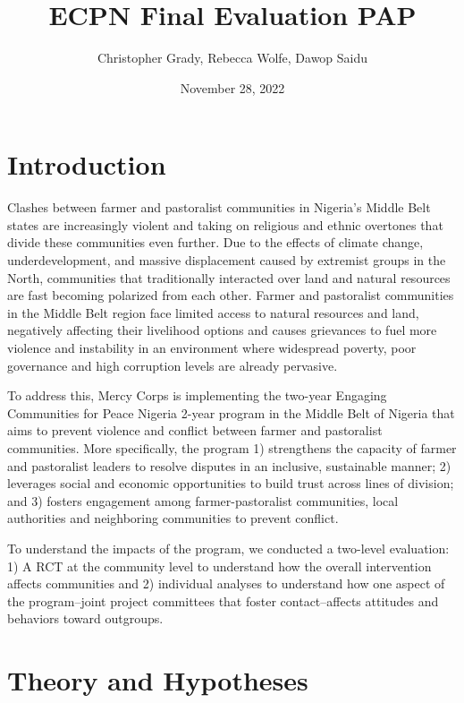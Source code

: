 \documentclass[
]{article}
\title{ECPN Final Evaluation PAP}
\author{Christopher Grady, Rebecca Wolfe, Dawop Saidu}
\date{November 28, 2022}
\begin{document}
\maketitle

\hypertarget{introduction}{%
\section{Introduction}\label{introduction}}

Clashes between farmer and pastoralist communities in Nigeria's Middle
Belt states are increasingly violent and taking on religious and ethnic
overtones that divide these communities even further. Due to the effects
of climate change, underdevelopment, and massive displacement caused by
extremist groups in the North, communities that traditionally interacted
over land and natural resources are fast becoming polarized from each
other. Farmer and pastoralist communities in the Middle Belt region face
limited access to natural resources and land, negatively affecting their
livelihood options and causes grievances to fuel more violence and
instability in an environment where widespread poverty, poor governance
and high corruption levels are already pervasive.

To address this, Mercy Corps is implementing the two-year Engaging
Communities for Peace Nigeria 2-year program in the Middle Belt of
Nigeria that aims to prevent violence and conflict between farmer and
pastoralist communities. More specifically, the program 1) strengthens
the capacity of farmer and pastoralist leaders to resolve disputes in an
inclusive, sustainable manner; 2) leverages social and economic
opportunities to build trust across lines of division; and 3) fosters
engagement among farmer-pastoralist communities, local authorities and
neighboring communities to prevent conflict.

To understand the impacts of the program, we conducted a two-level
evaluation: 1) A RCT at the community level to understand how the
overall intervention affects communities and 2) individual analyses to
understand how one aspect of the program--joint project committees that
foster contact--affects attitudes and behaviors toward outgroups.

\hypertarget{theory-and-hypotheses}{%
\section{Theory and Hypotheses}\label{theory-and-hypotheses}}
\end{document}
